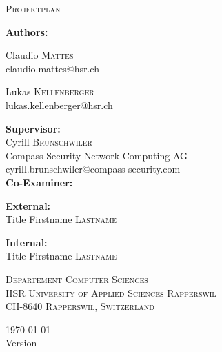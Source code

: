 \begin{titlepage}
	\centering
	\begin{figure}
		\qquad
		\vspace{0.5cm} 	 	
	\end{figure}

	{\scshape\Large Projektplan\par}
	\vspace{1.2cm}
	{\huge\bfseries \TITLE\par}
	\vspace{1.2cm}

	{\Large\textbf{Authors:} \\\vspace{0.2cm}}
	{\Large Claudio \textsc{Mattes} \\\small claudio.mattes@hsr.ch \par\vspace{0.2cm}
	\Large Lukas \textsc{Kellenberger} \\\small lukas.kellenberger@hsr.ch}

	\vspace{0.6cm}
	{\Large\textbf{Supervisor:} \\\vspace{0.2cm}}
	Cyrill \textsc{Brunschwiler}  \\ {\small Compass Security Network Computing AG} \\\small cyrill.brunschwiler@compass-security.com \\

	\vspace{0.6cm}
	{\Large\textbf{Co-Examiner:} \\\vspace{0.2cm}}
	{\textbf{External:} \\ Title Firstname \textsc{Lastname}
	 \par\vspace{0.2cm}
	 \textbf{Internal:} \\ Title Firstname \textsc{Lastname} }

	\vfill
	{\scshape\scriptsize Departement Computer Sciences \\ HSR University of Applied Sciences Rapperswil \\ CH-8640 Rapperswil, Switzerland \par}

	\vfill

    {\large \today \\ \small Version \VERSION}
\end{titlepage}
